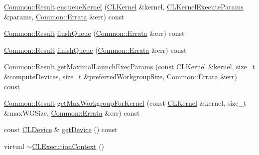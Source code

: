 \begin{DoxyCompactItemize}
\item 
\hyperlink{_errata_8h_a389396702f1aff6e71eb21328b0775c1}{Common\+::\+Result} \hyperlink{class_c_l_ray_tracer_1_1_open_c_l_utils_1_1_c_l_execution_context_ab9ac2f839ca431acef0aeb197d17225a}{enqueue\+Kernel} (\hyperlink{class_c_l_ray_tracer_1_1_open_c_l_utils_1_1_c_l_kernel}{C\+L\+Kernel} \&kernel, \hyperlink{class_c_l_ray_tracer_1_1_open_c_l_utils_1_1_c_l_kernel_execute_params}{C\+L\+Kernel\+Execute\+Params} \&params, \hyperlink{class_c_l_ray_tracer_1_1_common_1_1_errata}{Common\+::\+Errata} \&err) const 
\item 
\hyperlink{_errata_8h_a389396702f1aff6e71eb21328b0775c1}{Common\+::\+Result} \hyperlink{class_c_l_ray_tracer_1_1_open_c_l_utils_1_1_c_l_execution_context_a0dbaf20006e360e34ddc52a85246855e}{flush\+Queue} (\hyperlink{class_c_l_ray_tracer_1_1_common_1_1_errata}{Common\+::\+Errata} \&err) const 
\item 
\hyperlink{_errata_8h_a389396702f1aff6e71eb21328b0775c1}{Common\+::\+Result} \hyperlink{class_c_l_ray_tracer_1_1_open_c_l_utils_1_1_c_l_execution_context_a19fb4b24a7d6a184bb5884909761df53}{finish\+Queue} (\hyperlink{class_c_l_ray_tracer_1_1_common_1_1_errata}{Common\+::\+Errata} \&err) const 
\item 
\hyperlink{_errata_8h_a389396702f1aff6e71eb21328b0775c1}{Common\+::\+Result} \hyperlink{class_c_l_ray_tracer_1_1_open_c_l_utils_1_1_c_l_execution_context_a0333381f7772462c72ffbe043d7dfeeb}{get\+Maximal\+Launch\+Exec\+Params} (const \hyperlink{class_c_l_ray_tracer_1_1_open_c_l_utils_1_1_c_l_kernel}{C\+L\+Kernel} \&kernel, size\+\_\+t \&compute\+Devices, size\+\_\+t \&preferred\+Workgroup\+Size, \hyperlink{class_c_l_ray_tracer_1_1_common_1_1_errata}{Common\+::\+Errata} \&err) const 
\item 
\hyperlink{_errata_8h_a389396702f1aff6e71eb21328b0775c1}{Common\+::\+Result} \hyperlink{class_c_l_ray_tracer_1_1_open_c_l_utils_1_1_c_l_execution_context_a16f52f081efa477b9c8f34d28ce272d8}{get\+Max\+Workgroup\+For\+Kernel} (const \hyperlink{class_c_l_ray_tracer_1_1_open_c_l_utils_1_1_c_l_kernel}{C\+L\+Kernel} \&kernel, size\+\_\+t \&max\+W\+G\+Size, \hyperlink{class_c_l_ray_tracer_1_1_common_1_1_errata}{Common\+::\+Errata} \&err) const 
\item 
const \hyperlink{class_c_l_ray_tracer_1_1_open_c_l_utils_1_1_c_l_device}{C\+L\+Device} \& \hyperlink{class_c_l_ray_tracer_1_1_open_c_l_utils_1_1_c_l_execution_context_afa781473cfa153504e5efbf2208faa99}{get\+Device} () const 
\item 
virtual \hyperlink{class_c_l_ray_tracer_1_1_open_c_l_utils_1_1_c_l_execution_context_aa06c0a22a6f773ccca68d4ca5c51704d}{$\sim$\+C\+L\+Execution\+Context} ()
\end{DoxyCompactItemize}
